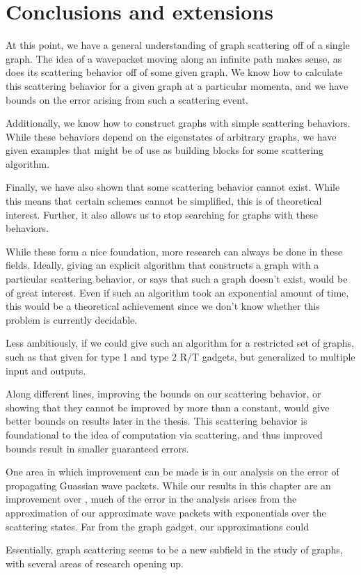 \documentclass[../thesis-main/thesis-main]{subfiles}
\begin{document}
\section{Conclusions and extensions}



At this point, we have a general understanding of graph scattering off of a single graph.  The idea of a wavepacket moving along an infinite path makes sense, as does its scattering behavior off of some given graph.  We know how to calculate this scattering behavior for a given graph at a particular momenta, and we have bounds on the error arising from such a scattering event.

Additionally, we know how to construct graphs with simple scattering behaviors.  While these behaviors depend on the eigenstates of arbitrary graphs, we have given examples that might be of use as building blocks for some scattering algorithm.

Finally, we have also shown that some scattering behavior cannot exist.  While this means that certain schemes cannot be simplified, this is of theoretical interest.  Further, it also allows us to stop searching for graphs with these behaviors.

While these form a nice foundation, more research can always be done in these fields.  Ideally, giving an explicit algorithm that constructs a graph with a particular scattering behavior, or says that such a graph doesn't exist, would be of great interest.  Even if such an algorithm took an exponential amount of time, this would be a theoretical achievement since we don't know whether this problem is currently decidable.  

Less ambitiously, if we could give such an algorithm for a restricted set of graphs, such as that given for type 1 and type 2 R/T gadgets, but generalized to multiple input and outputs.  

Along different lines, improving the bounds on our scattering behavior, or showing that they cannot be improved by more than a constant, would give better bounds on results later in the thesis.  This scattering behavior is foundational to the idea of computation via scattering, and thus improved bounds result in smaller guaranteed errors.

One area in which improvement can be made is in our analysis on the error of propagating Guassian wave packets.  While our results in this chapter are an improvement over \cite{MPQW}, much of the error in the analysis arises from the approximation of our approximate wave packets with exponentials over the scattering states.  Far from the graph gadget, our approximations could 


Essentially, graph scattering seems to be a new subfield in the study of graphs, with several areas of research opening up.

\biblio{}
\end{document}
